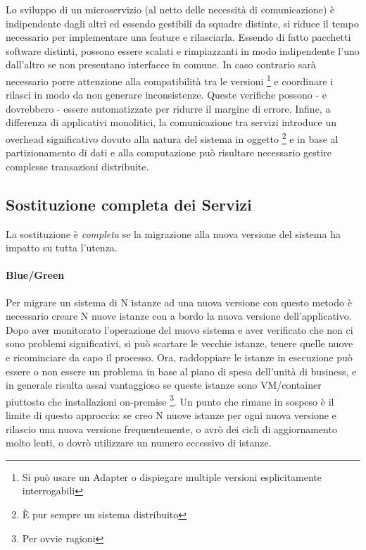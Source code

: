 \documentclass[a4paper,11pt,oneside, table]{article}
\begin{document}
  Lo sviluppo di un microservizio (al netto delle necessit\`a di comunicazione) \`e indipendente dagli altri ed essendo gestibili da squadre distinte, si riduce il tempo necessario per implementare una feature e rilasciarla. Essendo di fatto pacchetti software distinti, possono essere scalati e rimpiazzanti in modo indipendente l'uno dall'altro se non presentano interfacce in comune. In caso contrario sar\`a necessario porre attenzione alla compatibilit\`a tra le versioni \footnote{Si pu\`o usare un Adapter o dispiegare multiple versioni esplicitamente interrogabili} e coordinare i rilasci in modo da non generare inconsistenze. Queste verifiche possono - e dovrebbero - essere automatizzate per ridurre il margine di errore. Infine, a differenza di applicativi monolitici, la comunicazione tra servizi introduce un overhead significativo dovuto alla natura del sistema in oggetto \footnote{\`E pur sempre un sistema distribuito} e in base al partizionamento di dati e alla computazione pu\`o risultare necessario gestire complesse transazioni distribuite.

  \subsection{Sostituzione completa dei Servizi}

  La sostituzione \`e \textit{completa} se la migrazione alla nuova versione del sistema ha impatto su tutta l'utenza.

  \paragraph{Blue/Green}

  Per migrare un sistema di N istanze ad una nuova versione con questo metodo \`e necessario creare N nuove istanze con a bordo la nuova versione dell'applicativo. Dopo aver monitorato l'operazione del nuovo sistema e aver verificato che non ci sono problemi significativi, si pu\`o scartare le vecchie istanze, tenere quelle nuove e ricominciare da capo il processo. Ora, raddoppiare le istanze in esecuzione pu\`o essere o non essere un problema in base al piano di spesa dell'unit\`a di business, e in generale risulta assai vantaggioso se queste istanze sono VM/container piuttosto che installazioni on-premise \footnote{Per ovvie ragioni}. Un punto che rimane in sospeso \`e il limite di questo approccio: se creo N nuove istanze per ogni nuova versione e rilascio una nuova versione frequentemente, o avr\`o dei cicli di aggiornamento molto lenti, o dovr\`o utilizzare un numero eccessivo di istanze.
\end{document}
